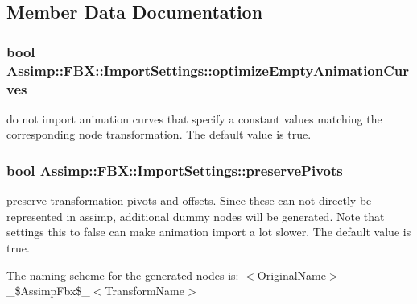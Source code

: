 \subsection{Member Data Documentation}
\hypertarget{struct_assimp_1_1_f_b_x_1_1_import_settings_ab4bf64aebd5facf693803876953c7bc0}{
\subsubsection[{optimize\+Empty\+Animation\+Curves}]{\setlength{\rightskip}{0pt plus 5cm}bool Assimp\+::\+F\+B\+X\+::\+Import\+Settings\+::optimize\+Empty\+Animation\+Curves}}\label{struct_assimp_1_1_f_b_x_1_1_import_settings_ab4bf64aebd5facf693803876953c7bc0}
do not import animation curves that specify a constant values matching the corresponding node transformation. The default value is true. \hypertarget{struct_assimp_1_1_f_b_x_1_1_import_settings_a431d64cc7cc705d0452cae146f5303d8}{
\subsubsection[{preserve\+Pivots}]{\setlength{\rightskip}{0pt plus 5cm}bool Assimp\+::\+F\+B\+X\+::\+Import\+Settings\+::preserve\+Pivots}}\label{struct_assimp_1_1_f_b_x_1_1_import_settings_a431d64cc7cc705d0452cae146f5303d8}
preserve transformation pivots and offsets. Since these can not directly be represented in assimp, additional dummy nodes will be generated. Note that settings this to false can make animation import a lot slower. The default value is true.

The naming scheme for the generated nodes is\+: $<$\+Original\+Name$>$\+\_\+\$\+Assimp\+Fbx\$\+\_\+$<$\+Transform\+Name$>$

